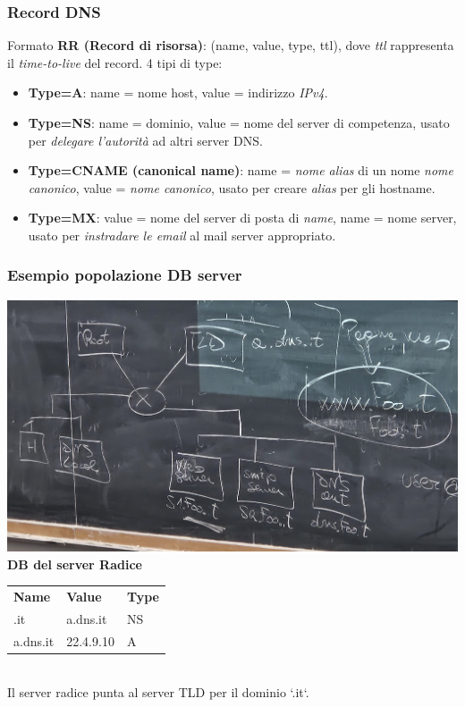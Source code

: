 \subsubsection{Record DNS}
Formato \textbf{RR (Record di risorsa)}: (name, value, type, ttl), dove \textit{ttl} rappresenta il \textit{time-to-live} del record.
4 tipi di type:
\begin{itemize}
  \item \textbf{Type=A}: name = nome host, value = indirizzo \textit{IPv4}.
  \item \textbf{Type=NS}: name = dominio, value = nome del server di competenza, usato per \textit{delegare l'autorità} ad altri server DNS.
  \item \textbf{Type=CNAME (canonical name)}: name = \textit{nome alias} di un nome \textit{nome canonico}, value = \textit{nome canonico}, usato per creare \textit{alias} per gli hostname.
  \item \textbf{Type=MX}: value = nome del server di posta di \textit{name}, name = nome server, usato per \textit{instradare le email} al mail server appropriato.
\end{itemize}

\subsubsection*{Esempio popolazione DB server}

\includegraphics[width=\textwidth]{./img/dbdns.jpg} \\

\bigskip
\textbf{DB del server Radice} \newline
\begin{tabular}{lll}
\textbf{Name} & \textbf{Value} & \textbf{Type} \\
.it           & a.dns.it       & NS            \\
a.dns.it      & 22.4.9.10      & A             
\end{tabular} \\
Il server radice punta al server TLD per il dominio `.it`.

